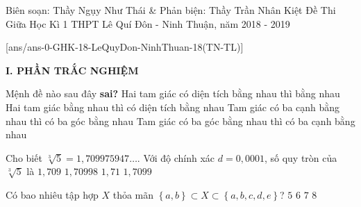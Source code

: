 \begin{name}
{Biên soạn: Thầy Ngụy Như Thái \& Phản biện: Thầy Trần Nhân Kiệt}
{Đề Thi Giữa Học Kì 1 THPT Lê Quí Đôn - Ninh Thuận, năm 2018 - 2019}
\end{name}

\setcounter{ex}{0}\setcounter{bt}{0}
[ans/ans-0-GHK-18-LeQuyDon-NinhThuan-18(TN-TL)]

\noindent\textbf{I. PHẦN TRẮC NGHIỆM}
\begin{ex}%
	Mệnh đề nào sau đây \textbf{sai?}
	\choice
	{\True Hai tam giác có diện tích bằng nhau thì bằng nhau}
	{Hai tam giác bằng nhau thì có diện tích bằng nhau}
	{Tam giác có ba cạnh bằng nhau thì có ba góc bằng nhau}
	{Tam giác có ba góc bằng nhau thì có ba cạnh bằng nhau}
\end{ex}

\begin{ex}%
	Cho biết $\sqrt[3]{5}=1{,}709975947\ldots$. Với độ chính xác $d=0{,}0001$, số quy tròn của $\sqrt[3]{5}$ là
	\choice
	{$1{,}709$}
	{$1{,}70998$}
	{\True $1{,}71$}
	{$1{,}7099$}
\end{ex}

\begin{ex}%
	Có bao nhiêu tập hợp $X$ thỏa mãn $\left\{{a,b}\right\}\subset X\subset\left\{{a, b, c, d, e}\right\}$?
	\choice
	{$5$}
	{$6$}
	{$7$}
	{\True $8$}
\end{ex}

